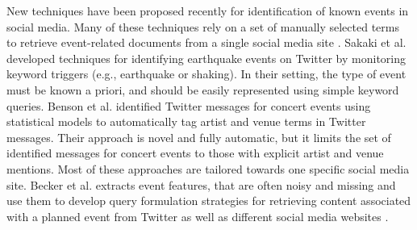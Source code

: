 
 
%


New techniques have been proposed recently for identification of known events in social media.
Many of these techniques rely on a set of manually selected terms to retrieve event-related
documents from a single social media site \cite{sakaki2010earthquake,yardi2010tweeting}.  Sakaki et al. \cite{sakaki2010earthquake} developed
techniques for identifying earthquake events on Twitter by monitoring keyword triggers
(e.g., earthquake or shaking). In their setting, the type of event must be known a
priori, and should be easily represented using simple keyword queries. Benson et al. \cite{benson2011event} identified Twitter messages for concert events using statistical models to automatically tag artist and venue terms in Twitter messages.
Their approach is novel and fully automatic, but it limits the set of identified messages for
concert events to those with explicit artist and venue mentions. Most of these approaches are tailored towards one specific social media site. Becker et al. \cite{becker2012identifying} extracts event features, that are often noisy and missing and use them to develop query formulation strategies for retrieving content associated with a planned event from Twitter \cite{becker2011automatic} as well as different social media websites \cite{becker2012identifying}. 




